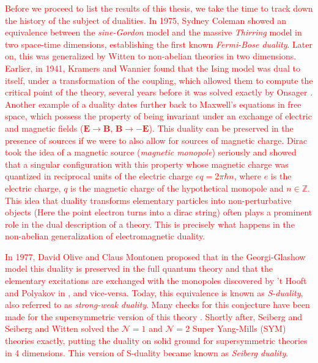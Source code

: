 \textcolor{red}{Before we proceed to list the results of this thesis, we take the time to track down the history of the subject of dualities. In 1975, Sydney Coleman \cite{Coleman:1974bu} showed an equivalence between the \textit{sine-Gordon} model \cite{Scott1973} and the massive \textit{Thirring} model \cite{Thirring1958} in two space-time dimensions, establishing the first known \textit{Fermi-Bose duality}. Later on, this was generalized by Witten \cite{Witten:1983ar} to non-abelian theories in two dimensions. Earlier, in 1941, Kramers and Wannier \cite{Kramers:1941kn} found that the Ising model was dual to itself, under a transformation of the coupling, which allowed them to compute the critical point of the theory, several years before it was solved exactly by Onsager \cite{Onsager:1943jn}. Another example of a duality dates further back to Maxwell's equations in free space, which possess the property of being invariant under an exchange of electric and magnetic fields ($\bm{E}\rightarrow \bm{B}$, $\bm{B}\rightarrow -\bm{E}$). This duality can be preserved in the presence of sources if we were to also allow for sources of magnetic charge. Dirac took the idea of a magnetic source (\textit{magnetic monopole}) seriously and showed that a singular configuration with this property whose magnetic charge was quantized in reciprocal units of the electric charge \cite{Dirac:1931kp} $eq = 2\pi \hbar n$, where $e$ is the electric charge, $q$ is the magnetic charge of the hypothetical monopole and $n \in \mathbb{Z}$. This idea that duality transforms elementary particles into non-perturbative objects (Here the point electron turns into a dirac string) often plays a prominent role in the dual description of a theory. This is precisely what happens in the non-abelian generalization of electromagnetic duality.}


\textcolor{red}{In 1977, David Olive and Claus Montonen \cite{Montonen:1977sn} proposed that in the Georgi-Glashow model this duality is preserved in the full quantum theory and that the elementary excitations are exchanged with the monopoles discovered by 't Hooft and Polyakov in \cite{Polyakov:1974ek, tHooft:1974kcl}, and vice-versa. Today, this equivalence is known as \textit{S-duality}, also referred to as \textit{strong-weak duality}. Many checks for this conjecture have been made for the supersymmetric version of this theory \cite{Osborn:1979tq, Witten:1978mh, Sen:1994yi, Vafa:1994tf}. Shortly after, Seiberg \cite{Seiberg:1994bz} and Seiberg and Witten \cite{Seiberg:1994rs} solved the $\mathcal{N}=1$ and $\mathcal{N}=2$ Super Yang-Mills (SYM) theories exactly, putting the duality on solid ground for supersymmetric theories in 4 dimensions. This version of S-duality became known as \textit{Seiberg duality}.}


